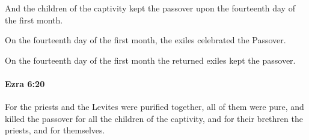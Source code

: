 			\begin{versebox}
					\item[BHS] 
					\item[LXX] 
					\item[ASV] And the children of the captivity kept the passover upon the fourteenth day of the first month.
					\item[NIV] On the fourteenth day of the first month, the exiles celebrated the Passover.
					\item[NRSV] On the fourteenth day of the first month the returned exiles kept the passover.
			\end{versebox}

		\paragraph{Ezra 6:20} %
			\label{EZRA-6-20}

			For the priests and the Levites were purified together, all of them were pure, and killed the passover for all the children of the captivity, and for their brethren the priests, and for themselves.

